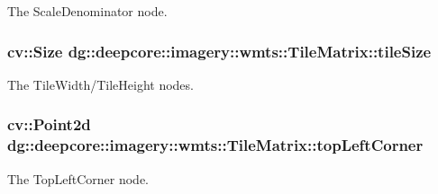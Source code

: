 The Scale\+Denominator node. 

\subsubsection[{\texorpdfstring{tile\+Size}{tileSize}}]{\setlength{\rightskip}{0pt plus 5cm}cv\+::\+Size dg\+::deepcore\+::imagery\+::wmts\+::\+Tile\+Matrix\+::tile\+Size}\hypertarget{structdg_1_1deepcore_1_1imagery_1_1wmts_1_1_tile_matrix_ace8dcd0a02171503108255096eac224f}{}\label{structdg_1_1deepcore_1_1imagery_1_1wmts_1_1_tile_matrix_ace8dcd0a02171503108255096eac224f}


The Tile\+Width/\+Tile\+Height nodes. 

\subsubsection[{\texorpdfstring{top\+Left\+Corner}{topLeftCorner}}]{\setlength{\rightskip}{0pt plus 5cm}cv\+::\+Point2d dg\+::deepcore\+::imagery\+::wmts\+::\+Tile\+Matrix\+::top\+Left\+Corner}\hypertarget{structdg_1_1deepcore_1_1imagery_1_1wmts_1_1_tile_matrix_ac821a1a8a6db19c1a91f564b99fcc33f}{}\label{structdg_1_1deepcore_1_1imagery_1_1wmts_1_1_tile_matrix_ac821a1a8a6db19c1a91f564b99fcc33f}


The Top\+Left\+Corner node. 

